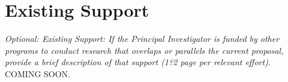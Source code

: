 \documentclass[11pt,english,letterpaper]{scrartcl}
\begin{document}
	
%
\clearpage
\section{Existing Support}

\textit{Optional: Existing Support: If the Principal Investigator is funded by other programs to conduct research that overlaps or parallels the current proposal, provide a brief description of that support (1?2 page per relevant effort).} \\

COMING SOON.
\end{document}
